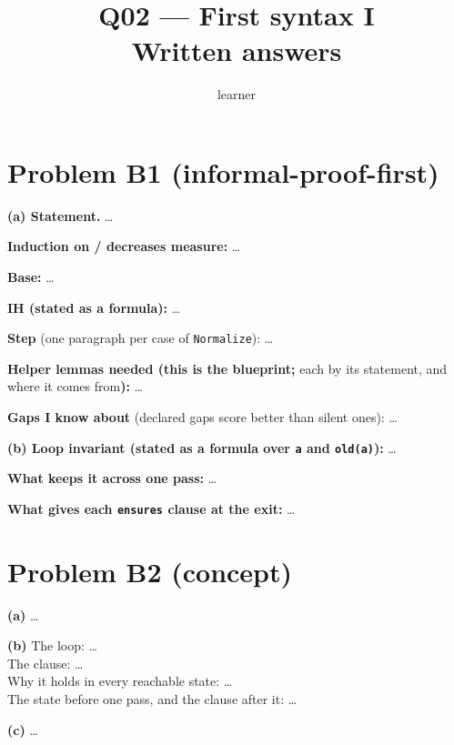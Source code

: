 \documentclass[11pt]{article}
\title{Q02 --- First syntax I \\ \large Written answers}
\author{learner}
\date{}
\begin{document}
\maketitle

\section*{Problem B1 (informal-proof-first)}\label{ans:B1}
\begin{answer}
\textbf{(a) Statement.} \dots

\textbf{Induction on / decreases measure:} \dots

\textbf{Base:} \dots

\textbf{IH (stated as a formula):} \dots

\textbf{Step} (one paragraph per case of \texttt{Normalize}): \dots

\textbf{Helper lemmas needed (this is the blueprint;} each by its statement,
and where it comes from\textbf{):} \dots

\textbf{Gaps I know about} (declared gaps score better than silent ones): \dots

\textbf{(b) Loop invariant (stated as a formula over \texttt{a} and
\texttt{old(a)}):} \dots

\textbf{What keeps it across one pass:} \dots

\textbf{What gives each \texttt{ensures} clause at the exit:} \dots
\end{answer}

\section*{Problem B2 (concept)}\label{ans:B2}
\begin{answer}
\textbf{(a)} \dots

\textbf{(b)} The loop: \dots \\
The clause: \dots \\
Why it holds in every reachable state: \dots \\
The state before one pass, and the clause after it: \dots

\textbf{(c)} \dots
\end{answer}

\end{document}
